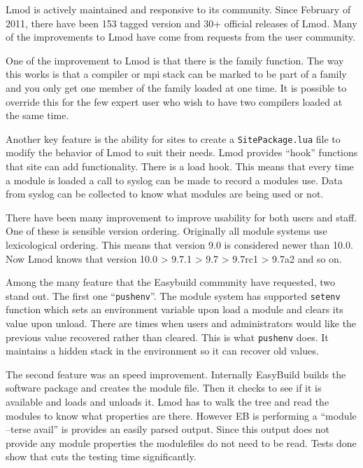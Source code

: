 Lmod is actively maintained and responsive to its community.  Since
February of 2011, there have been 153 tagged version and 30+ official
releases of Lmod.  Many of the improvements to Lmod have come from
requests from the user community.  

One of the improvement to Lmod is that there is the family function.
The way this works is that a compiler or mpi stack can be marked to be
part of a family and you only get one member of the family loaded at
one time.  It is possible to override this for the few expert user who
wish to have two compilers loaded at the same time.

Another key feature is the ability for sites to create a
\texttt{SitePackage.lua} file to modify the behavior of Lmod to suit
their needs.  Lmod provides ``hook'' functions that site can add
functionality.  There is a load hook.  This means that
every time a module is loaded a call to syslog can be
made to record a modules use.  Data from syslog can be collected to
know what modules are being used or not.

There have been many improvement to improve usability for both users
and staff.  One of these is sensible version ordering.  Originally all
module systems use lexicological ordering.  This means that version
9.0 is considered newer than 10.0.  Now Lmod knows that version 10.0 >
9.7.1 > 9.7 > 9.7rc1 > 9.7a2 and so on.

Among the many feature that the Easybuild community have requested,
two stand out.  The first one ``\texttt{pushenv}''.  The module system
has supported \texttt{setenv} function which sets an environment variable 
upon load a module and clears its value upon unload.  There are times
when users and administrators would like the previous value recovered
rather than cleared.  This is what \texttt{pushenv} does.  It
maintains a hidden stack in the environment so it can recover old
values.

The second feature was an speed improvement.  Internally EasyBuild
builds the software package and creates the module file.  Then it
checks to see if it is available and loads and unloads it.  Lmod has
to walk the tree and read the modules to know what properties are
there. However EB is performing a ``module --terse avail'' is provides
an easily parsed output.  Since this output does not provide any
module properties the modulefiles do not need to be read.  Tests done
show that cuts the testing time significantly.

